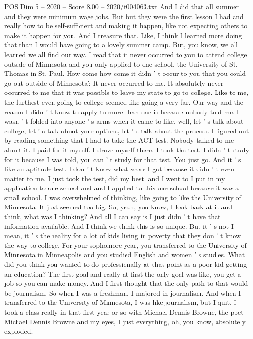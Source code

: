 \begin{textsample}{POS Dim 5 – 2020 – Score 8.00 – 2020/t004063.txt}
And I did that all summer and they were minimum wage jobs.
But but they were the first lesson I had and really how to be self-sufficient and making it happen, like not expecting others to make it happen for you.
And I treasure that.
Like, I think I learned more doing that than I would have going to a lovely summer camp.
But, you know, we all learned we all find our way.
I read that it never occurred to you to attend college outside of Minnesota and you only applied to one school, the University of St.
Thomas in St.
Paul.
How come how come it didn ' t occur to you that you could go out outside of Minnesota?
It never occurred to me.
It absolutely never occurred to me that it was possible to leave my state to go to college.
Like to me, the furthest even going to college seemed like going a very far.
Our way and the reason I didn ' t know to apply to more than one is because nobody told me.
I wasn ' t folded into anyone ' s arms when it came to like, well, let ' s talk about college, let ' s talk about your options, let ' s talk about the process.
I figured out by reading something that I had to take the ACT test.
Nobody talked to me about it.
I paid for it myself.
I drove myself there.
I took the test.
I didn ' t study for it because I was told, you can ' t study for that test.
You just go.
And it ' s like an aptitude test.
I don ' t know what score I got because it didn ' t even matter to me.
I just took the test, did my best, and I went to I put in my application to one school and and I applied to this one school because it was a small school.
I was overwhelmed of thinking, like going to like the University of Minnesota.
It just seemed too big.
So, yeah, you know, I look back at it and think, what was I thinking?
And all I can say is I just didn ' t have that information available.
And I think we think this is so unique.
But it ' s not I mean, it ' s the reality for a lot of kids living in poverty that they don ' t know the way to college.
For your sophomore year, you transferred to the University of Minnesota in Minneapolis and you studied English and women ' s studies.
What did you think you wanted to do professionally at that point as a poor kid getting an education?
The first goal and really at first the only goal was like, you get a job so you can make money.
And I first thought that the only path to that would be journalism.
So when I was a freshman, I majored in journalism.
And when I transferred to the University of Minnesota, I was like journalism, but I quit.
I took a class really in that first year or so with Michael Dennis Browne, the poet Michael Dennis Browne and my eyes, I just everything, oh, you know, absolutely exploded.

\end{textsample}
